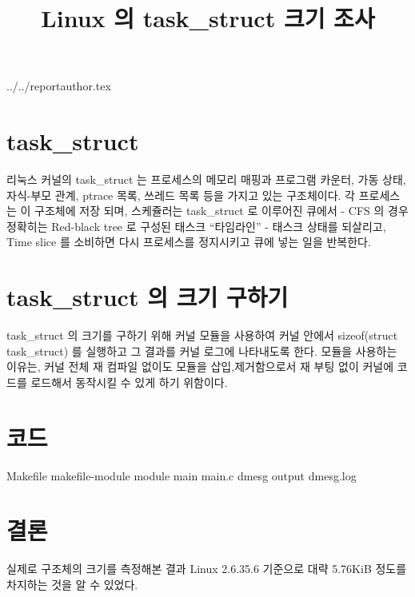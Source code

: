 \documentclass {article}
\begin{document}
\title {Linux 의 task\_struct 크기 조사}
 {../../reportauthor.tex}
\maketitle

\section {task\_struct}
리눅스 커널의 task\_struct 는 프로세스의 메모리 매핑과 프로그램 카운터, 가동 상태, 자식-부모 관계, ptrace 목록, 쓰레드 목록 등을 가지고 있는 구조체이다. 각 프로세스는 이 구조체에 저장\linebreak
되며, 스케쥴러는 task\_struct 로 이루어진 큐에서 - CFS 의 경우 정확히는 Red-black tree 로 구성된 태스크 ``타임라인'' - 태스크 상태를 되살리고, Time slice 를 소비하면 다시 프로세스를 정지시키고 큐에 넣는 일을 반복한다.
\section {task\_struct 의 크기 구하기}
task\_struct 의 크기를 구하기 위해 커널 모듈을 사용하여 커널 안에서 sizeof(struct task\_struct) 를 실행하고 그 결과를 커널 로그에 나타내도록 한다. 모듈을 사용하는 이유는, 커널 전체 재 컴파일 없이도 모듈을 삽입,제거함으로서 재 부팅 없이 커널에 코드를 로드해서 동작시킬 수 있게 하기 위함이다.
\section {코드}
Makefile
{makefile-module}
module main
{main.c}
dmesg output
{dmesg.log}
\section {결론}
실제로 구조체의 크기를 측정해본 결과 Linux 2.6.35.6 기준으로 대략 5.76KiB 정도를 차지하는 것을 알 수 있었다.
\end{document}
